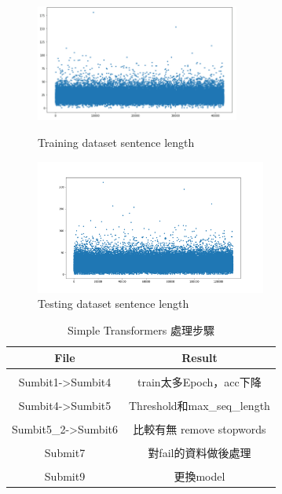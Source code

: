 \documentclass[8pt,a4paper]{article}
\begin{document}
\begin{figure}[H]
    \begin{minipage}[t]{0.5\textwidth}
    \begin{center}
        \includegraphics[width=190pt]{./Figures/train_dataset_sentence_length.png}
        \caption{Training dataset sentence length}
        \label{fig:train_dataset_sentence_length}
    \end{center}
    \end{minipage}
    \begin{minipage}[t]{0.5\textwidth}
        \begin{center}
            \includegraphics[width=215pt]{./Figures/test_dataset_sentence_length.png}
            \caption{Testing dataset sentence length}
            \label{fig:test_dataset_sentence_length}
        \end{center}
    \end{minipage}
\end{figure}   

\begin{table}[H]
    \centering
    \begin{tabular}{cc}
    \hline
    File & Result  \\ \hline \\
    Sumbit1-\textgreater{}Sumbit4    & train太多Epoch，acc下降         \\ \\
    Sumbit4-\textgreater{}Sumbit5    & Threshold和max\_seq\_length \\ \\
    Sumbit5\_2-\textgreater{}Sumbit6 & 比較有無 remove stopwords       \\ \\
    Submit7                          & 對fail的資料做後處理               \\ \\
    Submit9                          & 更換model                   
    \end{tabular}
    \caption{Simple Transformers 處理步驟}
    \label{tab:reaction_sampletransformers} 
\end{table}
\end{document}
